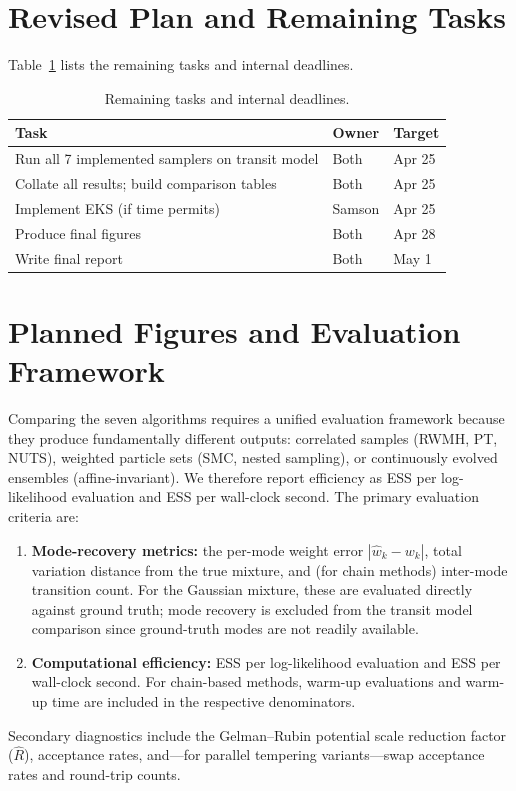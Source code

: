 \documentclass{article}
\begin{document}
\section{Revised Plan and Remaining Tasks}

Table~\ref{tab:plan} lists the remaining tasks and internal deadlines.

\begin{table}[h]
\centering\small
\begin{tabular}{@{}p{}p{}p{}@{}}
\toprule
\textbf{Task} & \textbf{Owner} & \textbf{Target} \\
\midrule
Run all 7 implemented samplers on transit model & Both   & Apr 25 \\
Collate all results; build comparison tables    & Both   & Apr 25 \\
Implement EKS (if time permits)                 & Samson & Apr 25 \\
Produce final figures                           & Both   & Apr 28 \\
Write final report                              & Both   & May 1  \\
\bottomrule
\end{tabular}
\caption{Remaining tasks and internal deadlines.}
\label{tab:plan}
\end{table}

\section{Planned Figures and Evaluation Framework}

Comparing the seven algorithms requires a unified evaluation framework because they produce
fundamentally different outputs: correlated samples (RWMH, PT, NUTS), weighted
particle sets (SMC, nested sampling), or continuously evolved ensembles (affine-invariant).
We therefore report efficiency as ESS per log-likelihood evaluation and ESS per
wall-clock second. The primary evaluation criteria are:
\begin{enumerate}
    \item \textbf{Mode-recovery metrics:} the per-mode weight error $|\hat{w}_k - w_k|$,
      total variation distance from the true mixture, and (for chain methods) inter-mode
      transition count. For the Gaussian mixture, these are evaluated directly against
      ground truth; mode recovery is excluded from the transit model comparison since
      ground-truth modes are not readily available.
    \item \textbf{Computational efficiency:} ESS per log-likelihood evaluation and ESS
      per wall-clock second. For chain-based methods, warm-up evaluations and warm-up
      time are included in the respective denominators.
\end{enumerate}
Secondary diagnostics include the Gelman--Rubin potential scale reduction factor
($\hat{R}$), acceptance rates, and---for parallel tempering variants---swap acceptance
rates and round-trip counts.
\end{document}
